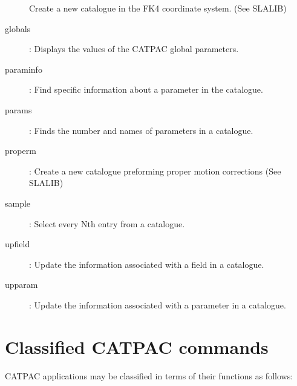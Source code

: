 \begin{description}
 Create a new catalogue in the FK4 coordinate system. (See SLALIB)
\item [globals]:
 Displays the values of the CATPAC global parameters.
\item [paraminfo]:
 Find specific information about a parameter in the catalogue.
\item [params]:
 Finds the number and names of parameters in a catalogue.
\item [properm]:
 Create a new catalogue preforming proper motion corrections (See SLALIB)
\item [sample]:
 Select every Nth entry from a catalogue.
\item [upfield]:
 Update the information associated with a field in a catalogue.
\item [upparam]:
 Update the information associated with a parameter in a catalogue.
\end{description}

\newpage
\section{Classified CATPAC commands}
\label{ap:classified}

{\small CATPAC} applications may be classified in terms of their
functions as follows:

